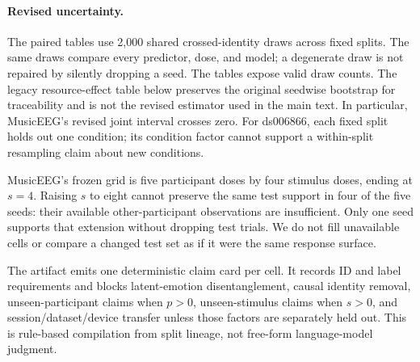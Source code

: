 


\paragraph{Revised uncertainty.}
The paired tables use 2,000 shared crossed-identity draws across fixed splits.
The same draws compare every predictor, dose, and model; a degenerate draw is
not repaired by silently dropping a seed. The tables expose valid draw counts.
The legacy resource-effect table below preserves the original seedwise bootstrap
for traceability and is not the revised estimator used in the main text.
In particular, MusicEEG's revised joint interval crosses zero. For ds006866,
each fixed split holds out one condition; its condition factor cannot support
a within-split resampling claim about new conditions.

MusicEEG's frozen grid is five participant doses by four stimulus doses,
ending at $s=4$. Raising $s$ to eight cannot preserve the same test support in
four of the five seeds: their available other-participant observations are
insufficient. Only one seed supports that extension without dropping test
trials. We do not fill unavailable cells or compare a changed test set as if
it were the same response surface.

The artifact emits one deterministic claim card per cell. It records ID and
label requirements and blocks latent-emotion disentanglement, causal identity
removal, unseen-participant claims when $p>0$, unseen-stimulus claims when
$s>0$, and session/dataset/device transfer unless those factors are separately
held out. This is rule-based compilation from split lineage, not free-form
language-model judgment.

